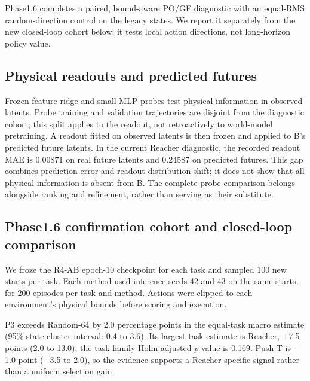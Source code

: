 Phase1.6 completes a paired, bound-aware PO/GF diagnostic with an equal-RMS random-direction control on the legacy states. We report it separately from the new closed-loop cohort below; it tests local action directions, not long-horizon policy value.

\subsection{Physical readouts and predicted futures}
Frozen-feature ridge and small-MLP probes test physical information in observed latents. Probe training and validation trajectories are disjoint from the diagnostic cohort; this split applies to the readout, not retroactively to world-model pretraining. A readout fitted on observed latents is then frozen and applied to B's predicted future latents. In the current Reacher diagnostic, the recorded readout MAE is 0.00871 on real future latents and 0.24587 on predicted futures. This gap combines prediction error and readout distribution shift; it does not show that all physical information is absent from B. The complete probe comparison belongs alongside ranking and refinement, rather than serving as their substitute.

\subsection{Phase1.6 confirmation cohort and closed-loop comparison}
We froze the R4-AB epoch-10 checkpoint for each task and sampled 100 new starts per task. Each method used inference seeds 42 and 43 on the same starts, for 200 episodes per task and method. Actions were clipped to each environment's physical bounds before scoring and execution.

\begin{table}[t]
 \centering\small
 
 \caption{Closed-loop success on the Phase1.6 confirmation cohort. Each cell pools 200 episodes from two inference seeds; the macro column weights the four tasks equally. This remains a fixed-checkpoint, single-training-seed evaluation.}
 \label{tab:reference_phase16_success}
\end{table}

P3 exceeds Random-64 by 2.0 percentage points in the equal-task macro estimate (95\% state-cluster interval: 0.4 to 3.6). Its largest task estimate is Reacher, +7.5 points (2.0 to 13.0); the task-family Holm-adjusted $p$-value is 0.169. Push-T is $-$1.0 point ($-$3.5 to 2.0), so the evidence supports a Reacher-specific signal rather than a uniform selection gain.

